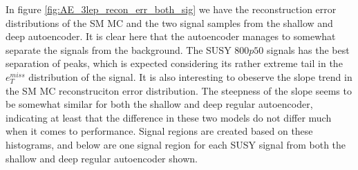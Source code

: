 In figure \ref{fig:AE_3lep_recon_err_both_sig} we have the reconstruction error distributions of the SM MC and the 
two signal samples from the shallow and deep autoencoder. It is clear here that the autoencoder manages to somewhat 
separate the signals from the background. The SUSY $800p50$ signals has the best separation of peaks, which is expected
considering its rather extreme tail in the $e_T^{miss}$ distribution of the signal. It is also interesting to obeserve 
the slope trend in the SM MC reconstruciton error distribution. The steepness of the slope seems to be somewhat similar 
for both the shallow and deep regular autoencoder, indicating at least that the difference in these two models do 
not differ much when it comes to performance. Signal regions are created based on these 
histograms, and below are one signal region for each SUSY signal from both the shallow and 
deep regular autoencoder shown. 



